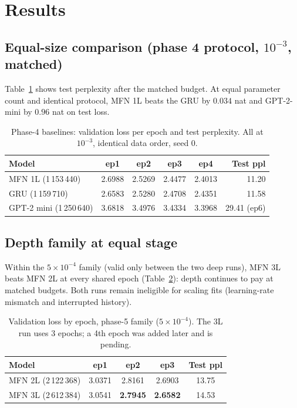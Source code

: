 \documentclass[11pt]{article}
\begin{document}
\section{Results}\label{sec:results}
\subsection{Equal-size comparison (phase 4 protocol, $10^{-3}$, matched)}
Table~\ref{tab:baselines} shows test perplexity after the matched budget.
At equal parameter count and identical protocol, MFN 1L beats the GRU by
$0.034$ nat and GPT-2-mini by $0.96$ nat on test loss.

\begin{table}[t]\centering\small
\caption{Phase-4 baselines: validation loss per epoch and test perplexity.
All at $10^{-3}$, identical data order, seed 0.}\label{tab:baselines}
\begin{tabular}{lccccr}
\toprule
Model & ep1 & ep2 & ep3 & ep4 & Test ppl \\
\midrule
MFN 1L (1\,153\,440) & 2.6988 & 2.5269 & 2.4477 & 2.4013 & 11.20 \\
GRU (1\,159\,710) & 2.6583 & 2.5280 & 2.4708 & 2.4351 & 11.58 \\
GPT-2 mini (1\,250\,640) & 3.6818 & 3.4976 & 3.4334 & 3.3968 & 29.41 (ep6) \\
\bottomrule
\end{tabular}
\end{table}

\subsection{Depth family at equal stage}\label{sec:depth}
Within the $5\times10^{-4}$ family (valid only between the two deep runs),
MFN 3L beats MFN 2L at every shared epoch (Table~\ref{tab:depth}): depth
continues to pay at matched budgets. Both runs remain ineligible for scaling
fits (learning-rate mismatch and interrupted history).

\begin{table}[t]\centering\small
\caption{Validation loss by epoch, phase-5 family ($5\times10^{-4}$). The
3L run uses 3 epochs; a 4th epoch was added later and is pending.}
\label{tab:depth}
\begin{tabular}{lcccc}
\toprule
Model & ep1 & ep2 & ep3 & Test ppl \\
\midrule
MFN 2L (2\,122\,368) & 3.0371 & 2.8161 & 2.6903 & 13.75 \\
MFN 3L (2\,612\,384) & 3.0541 & \textbf{2.7945} & \textbf{2.6582} & 14.53 \\
\bottomrule
\end{tabular}
\end{table}
\end{document}

